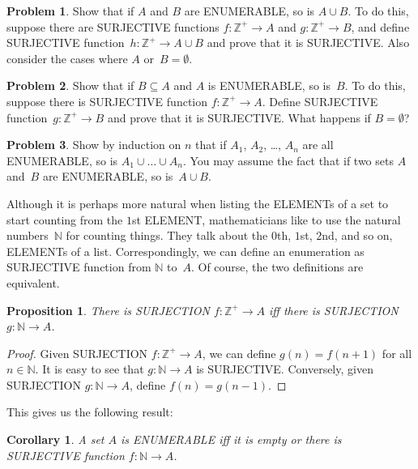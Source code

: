 \documentclass[10pt,a4paper]{article}
\newcommand*{\olup}[1]{\MakeUppercase{#1}}
\theoremstyle{plain}
\newtheorem{prop}[thm]{Proposition}
\newtheorem{cor}[thm]{Corollary}
\theoremstyle{definition}
\newtheorem{prob}{Problem}[section]
\theoremstyle{remark}
\newcommand*{\ollabel}[1]{\label{#1}}
\providecommand{\Nat}{\ensuremath{\mathbb{N}}}
\providecommand{\PosInt}{\mathbb{Z}^{+}}
\begin{document}
\begin{prob}
  Show that if $A$ and $B$ are \olup{enumerable}, so is $A \cup B$. To do
  this, suppose there are \olup{surjective} functions $f\colon \PosInt \to
  A$ and $g\colon \PosInt \to B$, and define \olup{surjective}
  function~$h\colon \PosInt \to A \cup B$ and prove that it is
  \olup{surjective}. Also consider the cases where $A$ or~$B = \emptyset$.
\end{prob}
  
\begin{prob}
  Show that if $B \subseteq A$ and $A$ is \olup{enumerable}, so is~$B$. To
  do this, suppose there is \olup{surjective} function $f\colon \PosInt \to
  A$. Define \olup{surjective} function~$g\colon \PosInt \to B$ and prove
  that it is \olup{surjective}. What happens if $B = \emptyset$?
\end{prob}
    
\begin{prob}
  Show by induction on $n$ that if $A_1$, $A_2$, \dots, $A_n$ are all
  \olup{enumerable}, so is $A_1 \cup \dots \cup A_n$. You may assume the
  fact that if two sets $A$ and~$B$ are \olup{enumerable}, so is~$A \cup
  B$. 
\end{prob}

Although it is perhaps more natural when listing the \olup{element}s of a
set to start counting from the $1$st \olup{element}, mathematicians like
to use the natural numbers~$\Nat$ for counting things. They
talk about the $0$th, $1$st, $2$nd, and so on, \olup{element}s of a list.
Correspondingly, we can define an enumeration as \olup{surjective}
function from $\Nat$ to~$A$. Of course, the two definitions are
equivalent.

\begin{prop}\ollabel{prop:enum-shift}
  There is \olup{surjection} $f\colon \PosInt \to A$ iff there is
  \olup{surjection} $g\colon \Nat \to A$.
\end{prop}

\begin{proof}
  Given \olup{surjection} $f\colon \PosInt \to A$, we can define $g(n) =
  f(n+1)$ for all $n \in \Nat$. It is easy to see that $g\colon \Nat
  \to A$ is \olup{surjective}. Conversely, given \olup{surjection} $g\colon
  \Nat \to A$, define $f(n) = g(n-1)$.
\end{proof}

This gives us the following result:

\begin{cor}\ollabel{cor:enum-nat}
A set $A$ is \olup{enumerable} iff it is empty or there is
\olup{surjective} function $f\colon \Nat \to A$.
\end{cor}
\end{document}
